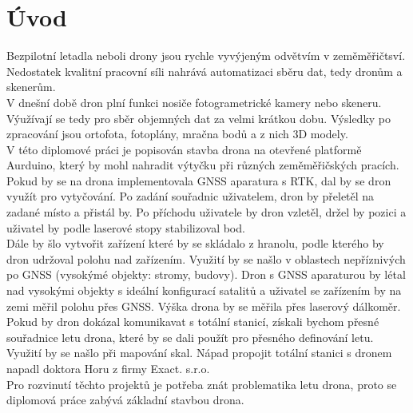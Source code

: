 \chapter{Úvod}
\label{0-uvod}

Bezpilotní letadla neboli drony jsou rychle vyvýjeným odvětvím v zeměměřičtsví. Nedostatek kvalitní pracovní síli nahrává automatizaci sběru dat, tedy dronům a skenerům.\\
V dnešní době dron plní funkci nosiče fotogrametrické kamery nebo skeneru. Výužívají se tedy pro sběr objemných dat za velmi krátkou dobu. Výsledky po zpracování jsou ortofota, fotoplány, mračna bodů a z nich 3D modely.\\
V této diplomové práci je popisován stavba drona na otevřené platformě Aurduino, který by mohl nahradit výtyčku při různých zeměměřičských pracích.\\
Pokud by se na drona implementovala GNSS aparatura s RTK, dal by se dron využít pro vytyčování. Po zadání souřadnic uživatelem, dron by přeletěl na zadané místo a přistál by. Po příchodu uživatele by dron vzletěl, držel by pozici a uživatel by podle laserové stopy stabilizoval bod.\\
Dále by šlo vytvořit zařízení které by se skládalo z hranolu, podle kterého by dron udržoval polohu nad zařízením. Využití by se našlo v oblastech nepříznivých po GNSS (vysokýmé objekty: stromy, budovy). Dron s GNSS aparaturou by létal nad vysokými objekty s ideální konfigurací satalitů a uživatel se zařízením by na zemi měřil polohu přes GNSS. Výška drona by se měřila přes laserový dálkoměr.\\
Pokud by dron dokázal komunikavat s totální stanicí, získali bychom přesné souřadnice letu drona, které by se dali použít pro přesného definování letu. Využití by se našlo při mapování skal. Nápad propojit totální stanici s dronem napadl doktora Horu z firmy Exact. s.r.o.\\
Pro rozvinutí těchto projektů je potřeba znát problematika letu drona, proto se diplomová práce zabývá základní stavbou drona.\\